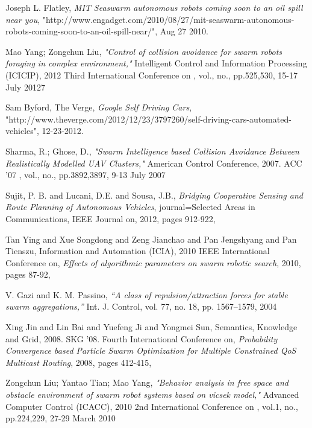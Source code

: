 \documentclass[journal]{IEEEtran}
\begin{document}
\begin{thebibliography}{1}
Joseph L. Flatley, \emph{MIT Seaswarm autonomous robots coming soon to an oil spill near you},
"http://www.engadget.com/2010/08/27/mit-seaswarm-autonomous-robots-coming-soon-to-an-oil-spill-near/", Aug 27 2010.

Mao Yang; Zongchun Liu, \emph{"Control of collision avoidance for swarm robots foraging in complex environment,"} Intelligent Control and Information Processing (ICICIP), 2012 Third International Conference on , vol., no., pp.525,530, 15-17 July 20127

Sam Byford, The Verge, \emph{Google Self Driving Cars}, "http://www.theverge.com/2012/12/23/3797260/self-driving-cars-automated-vehicles", 12-23-2012.

Sharma, R.; Ghose, D., \emph{"Swarm Intelligence based Collision Avoidance Between Realistically Modelled UAV Clusters,"} American Control Conference, 2007. ACC '07 , vol., no., pp.3892,3897, 9-13 July 2007

Sujit, P. B. and Lucani, D.E. and Sousa, J.B.,
\emph{Bridging Cooperative Sensing and Route Planning of Autonomous Vehicles}, journal=Selected Areas in Communications, IEEE Journal on,
2012, pages 912-922,

Tan Ying and Xue Songdong and Zeng Jianchao and Pan Jengshyang and Pan Tienszu,
Information and Automation (ICIA), 2010 IEEE International Conference on, \emph{Effects of algorithmic parameters on swarm robotic search},
2010, pages 87-92,

V. Gazi and K. M. Passino, \emph{“A class of repulsion/attraction forces for stable swarm aggregations,”} Int. J. Control, vol. 77, no. 18, pp.  1567–1579, 2004

Xing Jin and Lin Bai and Yuefeng Ji and Yongmei Sun,
Semantics, Knowledge and Grid, 2008. SKG '08. Fourth International Conference on, \emph{Probability Convergence based Particle Swarm Optimization for Multiple Constrained QoS Multicast Routing},
2008, pages 412-415,

Zongchun Liu; Yantao Tian; Mao Yang, \emph{"Behavior analysis in free space and obstacle environment of swarm robot systems based on vicsek model,"} Advanced Computer Control (ICACC), 2010 2nd International Conference on , vol.1, no., pp.224,229, 27-29 March 2010

\end{thebibliography}
\end{document}

